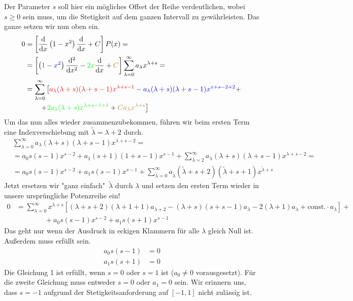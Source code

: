 \documentclass[a4paper,12pt,portrait]{book}
\numberwithin{equation}{section}
\begin{document}
Der Parameter $s$ soll hier ein mögliches Offset der Reihe verdeutlichen, wobei $s\geq 0$ sein muss, um die Stetigkeit auf dem ganzen Intervall zu gewährleisten. Das ganze setzen wir nun oben ein.
\begin{align*}
0 & = \left[\frac{\mathrm{d}{}}{\mathrm{d}{x}}\left(1-x^2\right)\frac{\mathrm{d}{}}{\mathrm{d}{x}} + C\right]P(x) = \\
 & = \left[\left({\color{red}1}-{\color{blue}x^2}\right)\frac{\mathrm{d}^2{}}{\mathrm{d}{x}^2}-{\color{green}2x}\frac{\mathrm{d}{}}{\mathrm{d}{x}}+{\color{brown}C}\right]\sum\limits_{\lambda=0}^\infty a_\lambda x^{\lambda+s} = \\
& = \sum\limits_{\lambda=0}^\infty\left[
{\color{red}a_\lambda(\lambda+s)(\lambda + s - 1)x^{\lambda+s-1} } - 
{\color{blue}a_\lambda(\lambda+s)(\lambda+s-1)x^{x+s-2+2}} + \right.\\
&\left. \quad  \quad + 
{\color{green}2a_\lambda(\lambda+s)x^{\lambda+s-1+1} } + 
{\color{brown}Ca_\lambda x^{\lambda+s}} 
\right]
\end{align*}
Um das nun alles wieder zusammenzubekommen, führen wir beim ersten Term eine Indexverschiebung mit $\tilde{\lambda}=\lambda + 2$ durch.
\begin{align*}
&\sum\limits_{\lambda=0}^\infty a_\lambda(\lambda+s)(\lambda+s-1)x^{\lambda+s-2} = \\&= 
a_0s(s-1)x^{s-2} + a_1(s+1)(1+s-1)x^{s-1} + 
\sum\limits_{\lambda=2}^\infty a_\lambda(\lambda+s)(\lambda+s-1)x^{\lambda+s-2} = \\
&=a_0s(s-1)x^{s-2}+a_1s(s-1)x^{s-1} +  
\sum\limits_{\tilde{\lambda}=0}^\infty a_{\tilde{\lambda}}(\tilde{\lambda}+s+2)(\tilde{\lambda}+s+1)x^{\tilde{\lambda}+s}
\end{align*} 
Jetzt ersetzen wir "ganz einfach"\ $\tilde{\lambda}$ durch $\lambda$ und setzen den ersten Term wieder in unsere ursprüngliche Potenzreihe ein!
\begin{align*}
0 & =\sum\limits_{\lambda=0}^\infty x^{\lambda+s}\left[
(\lambda+s+2)(\lambda+1+1)a_{\lambda+2} - (\lambda+s)(s+s-1)a_\lambda - 2(\lambda+1)a_\lambda + \text{const.}\cdot a_\lambda
\right] + \\
& \qquad\qquad+a_0s(s-1)x^{s-2} + a_1s(s+1)x^{s-1} 
\end{align*}
Das geht nur wenn der Ausdruck in eckigen Klammern für alle $\lambda$ gleich Null ist. Außerdem muss erfüllt sein.
\begin{align*}
a_0s(s-1)&=0 \tag{1}\\
a_1s(s+1)&=0 \tag{2}
\end{align*}
Die Gleichung 1 ist erfüllt, wenn $s=0$ oder $s=1$ ist ($a_0\neq 0$ vorausgesetzt). Für die zweite Gleichung muss entweder $s=0$ oder $a_1=0$ sein. Wir erinnern uns, dass $s=-1$ aufgrund der Stetigkeitsanforderung auf $[-1,1]$ nicht zulässig ist. 
\end{document}
